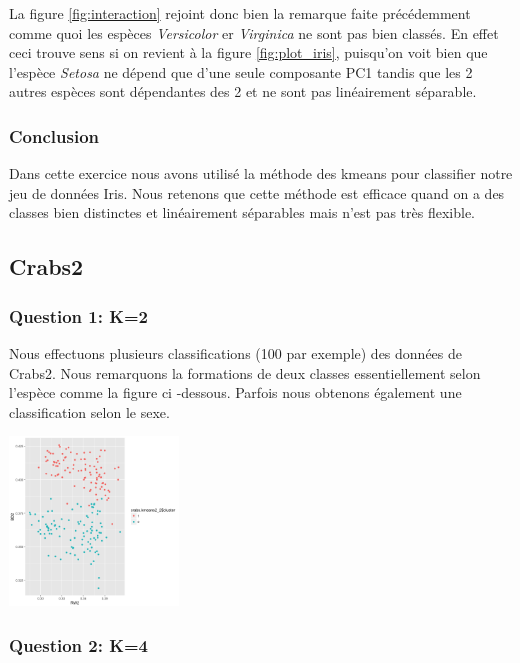 \documentclass[10pt]{article}
\begin{document}
La figure \ref{fig:interaction} rejoint donc bien la remarque faite précédemment comme quoi les espèces \textit{Versicolor} er \textit{Virginica} ne sont pas bien classés. En effet ceci trouve sens si on revient à la figure \ref{fig:plot_iris}, puisqu'on voit bien que l'espèce \textit{Setosa} ne dépend que d'une seule composante PC1 tandis que les 2 autres espèces sont dépendantes des 2 et ne sont pas linéairement séparable.
\subsubsection{Conclusion}
Dans cette exercice nous avons utilisé la méthode des kmeans pour classifier notre jeu de données Iris. Nous retenons que cette méthode est efficace quand on a des classes bien distinctes et linéairement séparables mais n'est pas très flexible.

\subsection{Crabs2}

\subsubsection{Question 1: K=2}

Nous effectuons plusieurs classifications (100 par exemple) des données de Crabs2. Nous remarquons la formations de deux classes essentiellement selon l'espèce comme la figure ci -dessous. Parfois nous obtenons également une classification selon le sexe.
\begin{center}
	\includegraphics[width=45mm]{Figures/Crabs2_2/kmeans2_1.png}
	\label{fig:crabs2_kmeans2}
\end{center}
\hspace{0.02\linewidth}

\subsubsection{Question 2: K=4}
\end{document}
